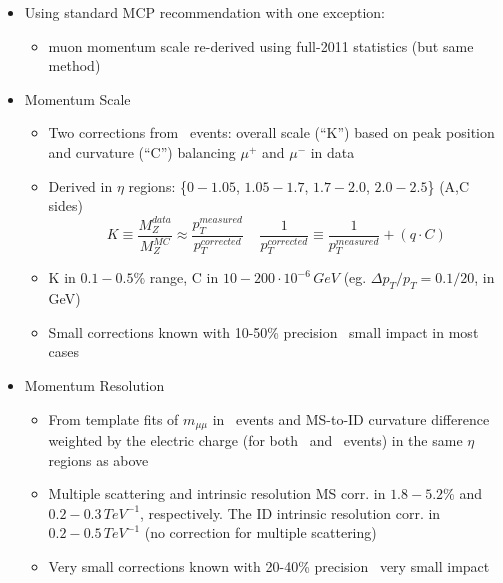 {

\begin{itemize}

\item Using standard MCP recommendation with one exception:
\begin{itemize}
\item muon momentum scale re-derived using full-2011 statistics (but same method)
\end{itemize}

\item Momentum Scale
\begin{itemize}
\item Two corrections from \Zmm\ events: overall scale (``K'') based on peak position 
and curvature (``C'') balancing $\mu^+$ and $\mu^-$ in data
\item Derived in $\eta$ regions: \{$0-1.05$, $1.05-1.7$, $1.7-2.0$, $2.0-2.5$\} (A,C sides) 
  $$K \equiv \frac{M_{Z}^{data}}{M_{Z}^{MC}} \approx \frac{p_{T}^{measured}}{p_{T}^{corrected}}~~~~~
  \frac{1}{p_{T}^{corrected}} \equiv \frac{1}{p_{T}^{measured}} + (q \cdot C)$$
\item K in $0.1-0.5\%$ range, C in $10-200\cdot 10^{-6}\,GeV$ (eg. $\Delta p_T/p_T=0.1/20$, in GeV)
\item Small corrections known with 10-50\% precision \raw\ small impact in most cases
\end{itemize}

\item Momentum Resolution
\begin{itemize}
\item From template fits of $m_{\mu\mu}$ in \Zmm\ events and MS-to-ID curvature difference weighted 
by the electric charge %
(for both \Zmm\ and \Wmn\ events) in the same $\eta$ regions as above
\item Multiple scattering and intrinsic resolution MS corr. in $1.8-5.2\%$ and $0.2-0.3\,TeV^{-1}$, respectively.
The ID intrinsic resolution corr. in $0.2-0.5\,TeV^{-1}$ (no correction for multiple scattering)
\item Very small corrections known with 20-40\% precision \raw\ very small impact
\end{itemize}

\end{itemize}

}


\newcommand{\CaloIso}{\ensuremath{\mathtt{Iso98}E_{T}^\mathrm{cone20}}}
\newcommand{\TrackIso}{\ensuremath{\mathtt{Iso97}p_{T}^\mathrm{cone40}}}
\newcommand{\TrackIsoMu}{\ensuremath{\sum p_T^{\mathrm{cone40}}/p_{T}<0.1}}

